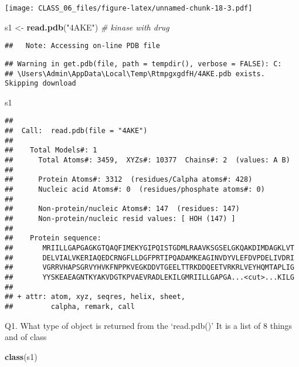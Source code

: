 \documentclass[
]{article}
\newenvironment{Shaded}{\begin{snugshade}}{\end{snugshade}}
\newcommand{\CommentTok}[1]{\textcolor[rgb]{0.56,0.35,0.01}{\textit{#1}}}
\newcommand{\KeywordTok}[1]{\textcolor[rgb]{0.13,0.29,0.53}{\textbf{#1}}}
\newcommand{\NormalTok}[1]{#1}
\newcommand{\StringTok}[1]{\textcolor[rgb]{0.31,0.60,0.02}{#1}}
\begin{document}
\texttt{[image: CLASS\_06\_files/figure-latex/unnamed-chunk-18-3.pdf]}

\begin{Shaded}
\begin{Highlighting}[]
\NormalTok{s1 <-}\StringTok{ }\KeywordTok{read.pdb}\NormalTok{(}\StringTok{"4AKE"}\NormalTok{) }\CommentTok{# kinase with drug}
\end{Highlighting}
\end{Shaded}

\begin{verbatim}
##   Note: Accessing on-line PDB file
\end{verbatim}

\begin{verbatim}
## Warning in get.pdb(file, path = tempdir(), verbose = FALSE): C:
## \Users\Admin\AppData\Local\Temp\RtmpgxgdfH/4AKE.pdb exists. Skipping download
\end{verbatim}

\begin{Shaded}
\begin{Highlighting}[]
\NormalTok{s1}
\end{Highlighting}
\end{Shaded}

\begin{verbatim}
## 
##  Call:  read.pdb(file = "4AKE")
## 
##    Total Models#: 1
##      Total Atoms#: 3459,  XYZs#: 10377  Chains#: 2  (values: A B)
## 
##      Protein Atoms#: 3312  (residues/Calpha atoms#: 428)
##      Nucleic acid Atoms#: 0  (residues/phosphate atoms#: 0)
## 
##      Non-protein/nucleic Atoms#: 147  (residues: 147)
##      Non-protein/nucleic resid values: [ HOH (147) ]
## 
##    Protein sequence:
##       MRIILLGAPGAGKGTQAQFIMEKYGIPQISTGDMLRAAVKSGSELGKQAKDIMDAGKLVT
##       DELVIALVKERIAQEDCRNGFLLDGFPRTIPQADAMKEAGINVDYVLEFDVPDELIVDRI
##       VGRRVHAPSGRVYHVKFNPPKVEGKDDVTGEELTTRKDDQEETVRKRLVEYHQMTAPLIG
##       YYSKEAEAGNTKYAKVDGTKPVAEVRADLEKILGMRIILLGAPGA...<cut>...KILG
## 
## + attr: atom, xyz, seqres, helix, sheet,
##         calpha, remark, call
\end{verbatim}

Q1. What type of object is returned from the `read.pdb()' It is a list
of 8 things and of class

\begin{Shaded}
\begin{Highlighting}[]
\KeywordTok{class}\NormalTok{(s1)}
\end{Highlighting}
\end{Shaded}
\end{document}
